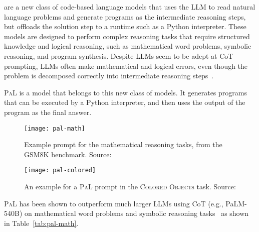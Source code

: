are a new class of code-based language models that uses the LLM to read natural language problems and generate programs as the intermediate reasoning steps, but offloads the solution step to a runtime such as a Python interpreter.
These models are designed to perform complex reasoning tasks that require structured knowledge and logical reasoning, such as mathematical word problems, symbolic reasoning, and program synthesis.
Despite LLMs seem to be adept at CoT prompting, LLMs often make mathematical and logical errors, even though the problem is decomposed correctly into intermediate reasoning steps~\cite{gao2022pal}.

\textsc{PaL} is a model that belongs to this new class of models.
It generates programs that can be executed by a Python interpreter, and then uses the output of the program as the final answer.
\begin{figure}[h!]
	\centering
	\texttt{[image: pal-math]}
	\caption{Example prompt for the mathematical reasoning tasks, from the GSM8K benchmark. Source: \textcite{gao2022pal}}
	\label{fig:pal-math}
\end{figure}
\begin{figure}[h!]
	\centering
	\texttt{[image: pal-colored]}
	\caption{An example for a \textsc{PaL} prompt in the \textsc{Colored Objects} task. Source: \textcite{gao2022pal}}
	\label{fig:pal-colored}
\end{figure}
\textsc{PaL} has been shown to outperform much larger LLMs using CoT (e.g., PaLM-540B) on mathematical word problems and symbolic reasoning tasks~\cite{gao2022pal} as shown in Table~\ref{tab:pal-math}.
